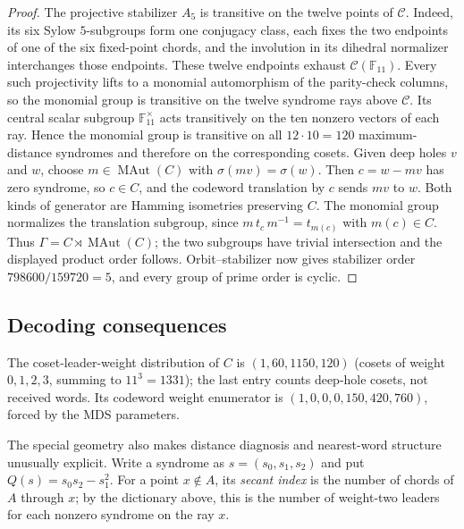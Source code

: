 \documentclass[11pt]{article}
\theoremstyle{definition}
\theoremstyle{remark}
\newcommand{\F}{\mathbb{F}}
\newcommand{\cC}{\mathcal{C}}
\begin{document}
\begin{proof}
The projective stabilizer $A_5$ is transitive on the twelve points of
$\cC$. Indeed, its six Sylow $5$-subgroups form one conjugacy class, each
fixes the two endpoints of one of the six fixed-point chords, and the involution in
its dihedral normalizer interchanges those endpoints. These twelve endpoints
exhaust $\cC(\F_{11})$. Every such
projectivity lifts to a monomial automorphism of the parity-check columns,
so the monomial group is transitive on the twelve syndrome rays above
$\cC$. Its central scalar subgroup $\F_{11}^{\times}$ acts transitively on
the ten nonzero vectors of each ray. Hence the monomial group is transitive
on all $12\cdot10=120$ maximum-distance syndromes and therefore on the
corresponding cosets. Given deep
holes $v$ and $w$, choose $m\in\operatorname{MAut}(C)$ with
$\sigma(mv)=\sigma(w)$. Then $c=w-mv$ has zero syndrome, so $c\in C$, and
the codeword translation by $c$ sends $mv$ to $w$. Both kinds of generator
are Hamming isometries preserving $C$. The monomial group normalizes the
translation subgroup, since $m\,t_c\,m^{-1}=t_{m(c)}$ with $m(c)\in C$.
Thus $\Gamma=C\rtimes\operatorname{MAut}(C)$; the two subgroups have trivial
intersection and the displayed product order follows. Orbit--stabilizer now gives stabilizer order
$798600/159720=5$, and every group of prime order is cyclic.
\end{proof}

\subsection{Decoding consequences}

The coset-leader-weight distribution of $C$ is $(1,60,1150,120)$
(cosets of weight $0,1,2,3$, summing to $11^3=1331$); the last entry counts
deep-hole cosets, not received words. Its codeword weight enumerator is
$(1,0,0,0,150,420,760)$, forced by the MDS parameters.

The special geometry also makes distance diagnosis and nearest-word structure
unusually explicit.  Write a syndrome as $s=(s_0,s_1,s_2)$ and put
$Q(s)=s_0s_2-s_1^2$.
For a point $x\notin A$, its \emph{secant index} is the number of chords of
$A$ through $x$; by the dictionary above, this is the number of
weight-two leaders for each nonzero syndrome on the ray $x$.
\end{document}
